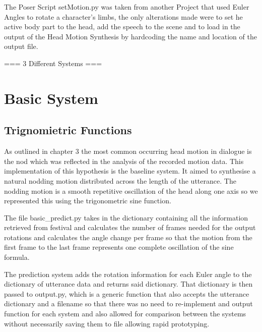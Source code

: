 \documentclass[bsc,frontabs,twoside,singlespacing,parskip]{infthesis}
\begin{document}
The Poser Script setMotion.py was taken from another Project that used Euler Angles to rotate a character's limbs, the only alterations made were to set he active body part to the head, add the speech to the scene and to load in the output of the Head Motion Synthesis by hardcoding the name and location of the output file.

=== 3 Different Systems ===

\section{Basic System} 

\subsection{Trignomietric Functions}

As outlined in chapter 3 the most common occurring head motion in dialogue is the nod which was reflected in the analysis of the recorded motion data. This implementation of this hypothesis is the baseline system. It aimed to synthesise a natural nodding motion distributed across the length of the utterance. The nodding motion is a smooth repetitive oscillation of the head along one axis so we represented this using the trigonometric sine function. 

The file basic\_predict.py takes in the dictionary containing all the information retrieved from festival and calculates the number of frames needed for the output rotations and calculates the angle change per frame so that the motion from the first frame to the last frame represents one complete oscillation of the sine formula.

 The prediction system adds the rotation information for each Euler angle to the dictionary of utterance data and returns said dictionary. That dictionary is then passed to output.py, which is a generic function that also accepts the utterance dictionary and a filename so that there was no need to re-implement and output function for each system and also allowed for comparison between the systems without necessarily saving them to file allowing rapid prototyping.
\end{document}
